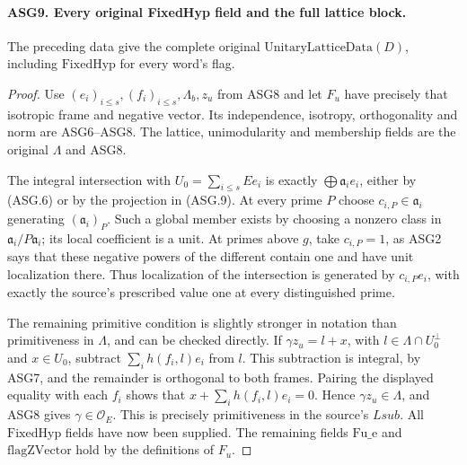 \documentclass[11pt,a4paper]{article}
\numberwithin{equation}{section}
\theoremstyle{remark}\newtheorem{remark}[theorem]{Remark}
\begin{document}
\paragraph{ASG9. Every original FixedHyp field and the full lattice block.}
\label{claim:ASG9}
The preceding data give the complete original
\(\mathrm{UnitaryLatticeData}(D)\), including
\(\mathrm{FixedHyp}\) for every word's flag.
\begin{proof}
Use \((e_i)_{i\le s},(f_i)_{i\le s},\Lambda_b,z_u\) from
ASG8 and let \(F_u\) have precisely that isotropic frame and
negative vector.  Its independence, isotropy, orthogonality and norm
are ASG6--ASG8.  The lattice, unimodularity and membership fields are
the original \(\Lambda\) and ASG8.

The integral intersection with \(U_0=\sum_{i\le s}Ee_i\)
is exactly \(\bigoplus\mathfrak a_i e_i\), either by (ASG.6)
or by the projection in (ASG.9).  At every prime \(P\) choose
\(c_{i,P}\in\mathfrak a_i\) generating
\((\mathfrak a_i)_P\).  Such a global member exists by choosing
a nonzero class in \(\mathfrak a_i/P\mathfrak a_i\); its
local coefficient is a unit.  At primes above \(g\), take
\(c_{i,P}=1\), as ASG2 says that these negative powers of the
different contain one and have unit localization there.
Thus localization of the intersection is generated by
\(c_{i,P}e_i\), with exactly the source's prescribed value one
at every distinguished prime.

The remaining primitive condition is slightly stronger in notation
than primitiveness in \(\Lambda\), and can be checked directly.
If \(\gamma z_u=l+x\), with
\(l\in\Lambda\cap U_0^\perp\) and \(x\in U_0\), subtract
\(\sum_i h(f_i,l)e_i\) from \(l\).  This subtraction is
integral, by ASG7, and the remainder is orthogonal to both frames.
Pairing the displayed equality with each \(f_i\) shows that
\(x+\sum_i h(f_i,l)e_i=0\).  Hence \(\gamma z_u\in\Lambda\),
and ASG8 gives \(\gamma\in\mathcal O_E\).
This is precisely primitiveness in the source's \(Lsub\).
All \(\mathrm{FixedHyp}\) fields have now been supplied.
The remaining fields \(\mathrm{Fu\_\allowbreak e}\) and
\(\mathrm{flagZVector}\) hold by the definitions of \(F_u\).
\end{proof}

\end{document}
